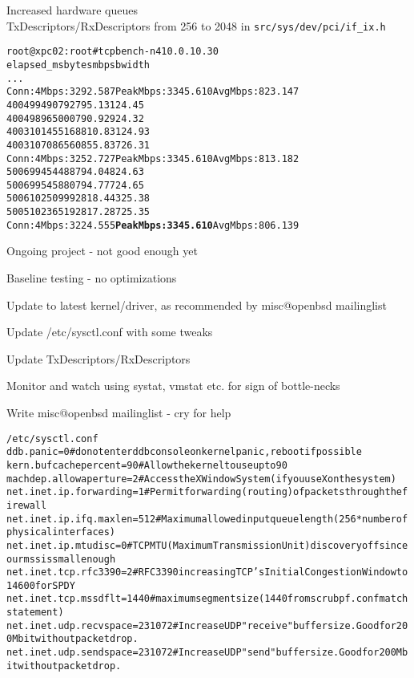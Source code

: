 \documentclass[20pt,landscape,a4paper,footrule]{foils}
\begin{document}
Increased hardware queues\\
TxDescriptors/RxDescriptors from 256 to 2048
in \verb+src/sys/dev/pci/if_ix.h+
\begin{alltt}\small
root@xpc02:root# tcpbench -n 4 10.0.10.30
 elapsed_ms          bytes         mbps   bwidth 
...
Conn:   4 Mbps:     3292.587 Peak Mbps:     3345.610 Avg Mbps:      823.147
       4004       99490792      795.131   24.45% 
       4004       98965000      790.929   24.32% 
       4003      101455168      810.831   24.93% 
       4003      107086560      855.837   26.31% 
Conn:   4 Mbps:     3252.727 Peak Mbps:     3345.610 Avg Mbps:      813.182
       5006       99454488      794.048   24.63% 
       5006       99545880      794.777   24.65% 
       5006      102509992      818.443   25.38% 
       5005      102365192      817.287   25.35% 
Conn:   4 Mbps:     3224.555 {\bf Peak Mbps:     3345.610} Avg Mbps:      806.139
\end{alltt}

\centerline{Ongoing project - not good enough yet}


\begin{list1}
\item Baseline testing - no optimizations 
\item Update to latest kernel/driver, as recommended by misc@openbsd mailinglist
\item Update /etc/sysctl.conf with some tweaks
\item Update TxDescriptors/RxDescriptors
\item Monitor and watch using systat, vmstat etc. for sign of bottle-necks
\item Write misc@openbsd mailinglist - cry for help
\end{list1}


\begin{alltt}\scriptsize
/etc/sysctl.conf
ddb.panic=0                    # do not enter ddb console on kernel panic, reboot if possible
kern.bufcachepercent=90        # Allow the kernel to use up to 90% of the RAM for cache (default 10%)
machdep.allowaperture=2        # Access the X Window System (if you use X on the system)
net.inet.ip.forwarding=1       # Permit forwarding (routing) of packets through the firewall
net.inet.ip.ifq.maxlen=512     # Maximum allowed input queue length (256*number of physical interfaces)
net.inet.ip.mtudisc=0          # TCP MTU (Maximum Transmission Unit) discovery off since our mss is small enough
net.inet.tcp.rfc3390=2         # RFC3390 increasing TCP's Initial Congestion Window to 14600 for SPDY
net.inet.tcp.mssdflt=1440      # maximum segment size (1440 from scrub pf.conf match statement)
net.inet.udp.recvspace=231072 # Increase UDP "receive" buffer size. Good for 200Mbit without packet drop.
net.inet.udp.sendspace=231072 # Increase UDP "send" buffer size. Good for 200Mbit without packet drop.
\end{alltt}
\end{document}
